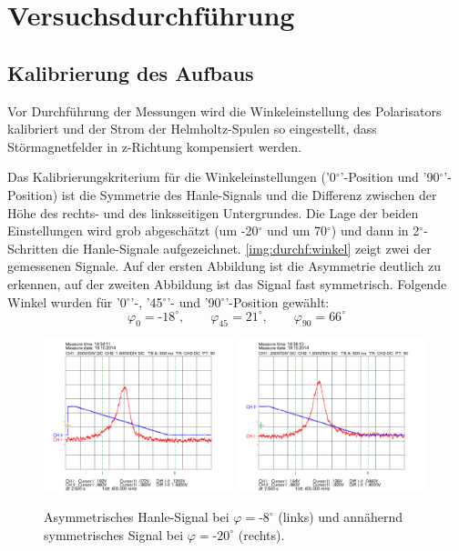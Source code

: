 \section{Versuchsdurchführung}

\subsection{Kalibrierung des Aufbaus}
\label{sub:calibration}

Vor Durchführung der Messungen wird die Winkeleinstellung des Polarisators kalibriert
und der Strom der Helmholtz-Spulen so eingestellt,
dass Störmagnetfelder in z-Richtung kompensiert werden.

Das Kalibrierungskriterium für die Winkeleinstellungen ('0$^\circ$'-Position und '90$^\circ$'-Position)
ist die Symmetrie des Hanle-Signals und die Differenz zwischen
der Höhe des rechts- und des linksseitigen Untergrundes.
Die Lage der beiden Einstellungen wird grob abgeschätzt (um -20$^\circ$ und um 70$^\circ$)
und dann in 2$^\circ$-Schritten die Hanle-Signale aufgezeichnet.
\autoref{img:durchf:winkel} zeigt zwei der gemessenen
Signale. Auf der ersten Abbildung ist die Asymmetrie deutlich zu erkennen,
auf der zweiten Abbildung ist das Signal fast symmetrisch.
Folgende Winkel wurden für '0$^\circ$'-, '45$^\circ$'- und '90$^\circ$'-Position gewählt:
\begin{equation}
\label{eq:calang}
 \varphi_0=\text{-}18^\circ, \qquad \varphi_{45}=21^\circ, \qquad \varphi_{90}=66^\circ
\end{equation}
\begin{figure}[H]
\begin{center}
  \includegraphics[width=0.49\textwidth]{../data/1/-7_5.png}
  \includegraphics[width=0.49\textwidth]{../data/1/-20.png}
  \caption{Asymmetrisches Hanle-Signal bei $\varphi=\text{-}8^\circ$ (links) und
  annähernd symmetrisches Signal bei $\varphi=\text{-}20^\circ$ (rechts).}
  \label{img:durchf:winkel}
\end{center}
\end{figure}
